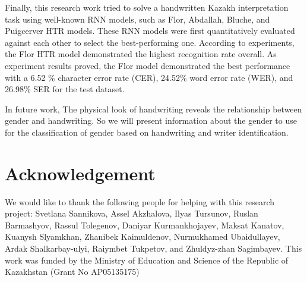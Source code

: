 \documentclass[preprint,12pt]{elsarticle}
\begin{document}
Finally, this research work tried to solve a handwritten Kazakh interpretation task using well-known RNN models, such as Flor, Abdallah, Bluche, and Puigcerver HTR models. These RNN models were first quantitatively evaluated against each other to select the best-performing one. According to experiments, the Flor HTR model demonstrated the highest recognition rate overall. As experiment results proved, the Flor model demonstrated the best performance with a 6.52 \% character error rate (CER), 24.52\% word error rate (WER), and 26.98\% SER for the test dataset.

In future work, The physical look of handwriting reveals the relationship between gender and handwriting. So we will present information about the gender to use for the classification of gender based on handwriting and writer identification.

\section{Acknowledgement}
We would like to thank the following people for helping with this research project:
Svetlana Sannikova,
Assel Akzhalova,
Ilyas Tursunov,
Ruslan Barmashyov,
Rassul Tolegenov,
Daniyar Kurmankhojayev,
Maksat Kanatov,
Kuanysh Slyamkhan,
Zhanibek Kaimuldenov,
Nurmukhamed Ubaidullayev,
Ardak Shalkarbay-ulyi,
Raiymbet Tukpetov, 
and
Zhuldyz-zhan Sagimbayev.
This work was funded by the Ministry of Education and Science of the Republic of Kazakhstan (Grant No AP05135175)

  
 
\end{document}

